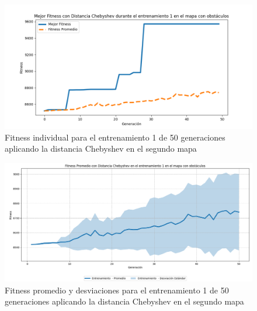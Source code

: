\documentclass[conference]{IEEEtran}
\begin{document}
\begin{figure}[H]
    \centering
    \includegraphics[width=0.9 \linewidth]{Chebyshev/Mapa2/Fitness_1_Map2_Cheby_50Gen.png}
    \caption{Fitness individual para el entrenamiento 1 de 50 generaciones aplicando la distancia Chebyshev en el segundo mapa}
    \label{fig:cheb_1_50_m2}
\end{figure}
\begin{figure}[H]
    \centering
    \includegraphics[width=0.9 \linewidth]{Chebyshev/Mapa2/Fitness_1_Map2_Cheby_50Gen_Sombra.png}
    \caption{Fitness promedio y desviaciones para el entrenamiento 1 de 50 generaciones aplicando la distancia Chebyshev en el segundo mapa}
    \label{fig:cheb_1_50_sombra_m2}
\end{figure}
\end{document}
